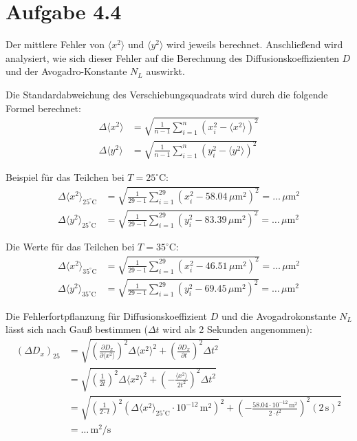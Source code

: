\documentclass[12pt,a4paper]{article}
\begin{document}
\section*{Aufgabe 4.4}

Der mittlere Fehler von $\langle x^2 \rangle$ und $\langle y^2 \rangle$ wird jeweils berechnet. Anschließend wird analysiert, wie sich dieser Fehler auf die Berechnung des Diffusionskoeffizienten $D$ und der Avogadro-Konstante $N_L$ auswirkt.

Die Standardabweichung des Verschiebungsquadrats wird durch die folgende Formel berechnet:
\begin{align*}
\Delta \langle x^2 \rangle &= \sqrt{ \frac{1}{n-1} \sum_{i=1}^n (x_i^2 - \langle x^2 \rangle)^2 } \\
\Delta \langle y^2 \rangle &= \sqrt{ \frac{1}{n-1} \sum_{i=1}^n (y_i^2 - \langle y^2 \rangle)^2 }
\end{align*}

Beispiel für das Teilchen bei $T = 25^\circ\text{C}$:
\begin{align*}
\Delta \langle x^2 \rangle_{25^\circ\text{C}} &= \sqrt{ \frac{1}{29-1} \sum_{i=1}^{29} (x_i^2 - 58.04 \, \mu\text{m}^2)^2 } = \dots \, \mu\text{m}^2 \\
\Delta \langle y^2 \rangle_{25^\circ\text{C}} &= \sqrt{ \frac{1}{29-1} \sum_{i=1}^{29} (y_i^2 - 83.39 \, \mu\text{m}^2)^2 } = \dots \, \mu\text{m}^2
\end{align*}

Die Werte für das Teilchen bei $T = 35^\circ\text{C}$:
\begin{align*}
\Delta \langle x^2 \rangle_{35^\circ\text{C}} &= \sqrt{ \frac{1}{29-1} \sum_{i=1}^{29} (x_i^2 - 46.51 \, \mu\text{m}^2)^2 } = \dots \, \mu\text{m}^2 \\
\Delta \langle y^2 \rangle_{35^\circ\text{C}} &= \sqrt{ \frac{1}{29-1} \sum_{i=1}^{29} (y_i^2 - 69.45 \, \mu\text{m}^2)^2 } = \dots \, \mu\text{m}^2
\end{align*}

Die Fehlerfortpflanzung für Diffusionskoeffizient $D$ und die Avogadrokonstante $N_L$ lässt sich nach Gauß bestimmen ($\Delta t$ wird als 2 Sekunden angenommen):
\begin{align*}
(\Delta D_x)_{25} &= \sqrt{ \left( \frac{\partial D_x}{\partial \langle x^2 \rangle} \right)^2 \Delta \langle x^2 \rangle^2 + \left( \frac{\partial D_x}{\partial t} \right)^2 \Delta t^2 } \\
&= \sqrt{ \left( \frac{1}{2t} \right)^2 \Delta \langle x^2 \rangle^2 + \left( - \frac{\langle x^2 \rangle}{2t^2} \right)^2 \Delta t^2 } \\
&= \sqrt{ \left( \frac{1}{2 \cdot t} \right)^2 (\Delta \langle x^2 \rangle_{25^\circ\text{C}} \cdot 10^{-12} \, \text{m}^2)^2 + \left( - \frac{58.04 \cdot 10^{-12} \, \text{m}^2}{2 \cdot t^2} \right)^2 (2 \, \text{s})^2 } \\
&= \dots \, \text{m}^2/\text{s}
\end{align*}
\end{document}
